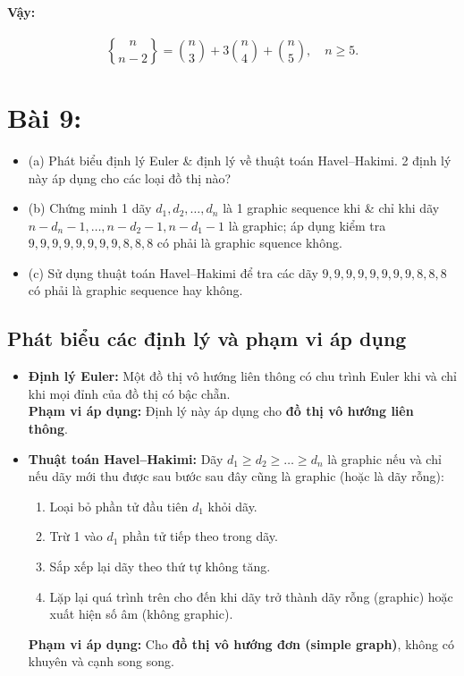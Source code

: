 \documentclass{article}
\newcommand{\stirlingII}[2]{\genfrac{\{}{\}}{0pt}{}{#1}{#2}}
\begin{document}
	\paragraph{Vậy:}
	\[
	\stirlingII{n}{n - 2} = \binom{n}{3} + 3\binom{n}{4} + \binom{n}{5}, \quad n \ge 5.
	\]
	
	\section*{Bài 9:}
	\begin{itemize}
		\item (a) Phát biểu định lý Euler \& định lý về thuật toán Havel--Hakimi. 2 định lý này áp dụng cho các loại đồ thị nào? 
		\item (b) Chứng minh 1 dãy $d_1,d_2,\ldots,d_n$ là 1 graphic sequence khi \& chỉ khi dãy $n - d_n - 1,\ldots,n - d_2 - 1,n - d_1 - 1$ là graphic; áp dụng kiểm tra $9,9,9,9,9,9,9,9,8,8,8$ có phải là graphic squence không. 
		\item (c) Sử dụng thuật toán Havel--Hakimi để tra các dãy $9,9,9,9,9,9,9,9,8,8,8$ có phải là graphic sequence hay không.
	\end{itemize}
	 
	 \subsection*{Phát biểu các định lý và phạm vi áp dụng}
	 \begin{itemize}
	 	\item \textbf{Định lý Euler:} Một đồ thị vô hướng liên thông có chu trình Euler khi và chỉ khi mọi đỉnh của đồ thị có bậc chẵn.\\
	 	\textbf{Phạm vi áp dụng:} Định lý này áp dụng cho \textbf{đồ thị vô hướng liên thông}.
	 	
	 	\item \textbf{Thuật toán Havel--Hakimi:} Dãy $d_1 \ge d_2 \ge \ldots \ge d_n$ là graphic nếu và chỉ nếu dãy mới thu được sau bước sau đây cũng là graphic (hoặc là dãy rỗng):
	 	\begin{enumerate}
	 		\item Loại bỏ phần tử đầu tiên $d_1$ khỏi dãy.
	 		\item Trừ 1 vào $d_1$ phần tử tiếp theo trong dãy.
	 		\item Sắp xếp lại dãy theo thứ tự không tăng.
	 		\item Lặp lại quá trình trên cho đến khi dãy trở thành dãy rỗng (graphic) hoặc xuất hiện số âm (không graphic).
	 	\end{enumerate}
	 	\textbf{Phạm vi áp dụng:} Cho \textbf{đồ thị vô hướng đơn (simple graph)}, không có khuyên và cạnh song song.
	 \end{itemize}
	
\end{document}
